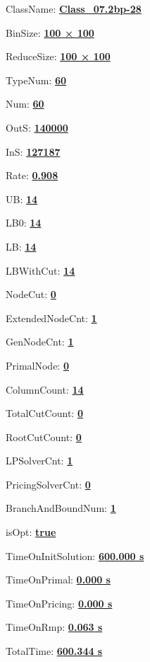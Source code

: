 \documentclass[11pt]{article}
\begin{document}
\pagestyle{empty}


ClassName: \underline{\textbf{Class_07.2bp-28}}
\par
BinSize: \underline{\textbf{100 × 100}}
\par
ReduceSize: \underline{\textbf{100 × 100}}
\par
TypeNum: \underline{\textbf{60}}
\par
Num: \underline{\textbf{60}}
\par
OutS: \underline{\textbf{140000}}
\par
InS: \underline{\textbf{127187}}
\par
Rate: \underline{\textbf{0.908}}
\par
UB: \underline{\textbf{14}}
\par
LB0: \underline{\textbf{14}}
\par
LB: \underline{\textbf{14}}
\par
LBWithCut: \underline{\textbf{14}}
\par
NodeCut: \underline{\textbf{0}}
\par
ExtendedNodeCnt: \underline{\textbf{1}}
\par
GenNodeCnt: \underline{\textbf{1}}
\par
PrimalNode: \underline{\textbf{0}}
\par
ColumnCount: \underline{\textbf{14}}
\par
TotalCutCount: \underline{\textbf{0}}
\par
RootCutCount: \underline{\textbf{0}}
\par
LPSolverCnt: \underline{\textbf{1}}
\par
PricingSolverCnt: \underline{\textbf{0}}
\par
BranchAndBoundNum: \underline{\textbf{1}}
\par
isOpt: \underline{\textbf{true}}
\par
TimeOnInitSolution: \underline{\textbf{600.000 s}}
\par
TimeOnPrimal: \underline{\textbf{0.000 s}}
\par
TimeOnPricing: \underline{\textbf{0.000 s}}
\par
TimeOnRmp: \underline{\textbf{0.063 s}}
\par
TotalTime: \underline{\textbf{600.344 s}}
\par
\newpage


\end{document}
